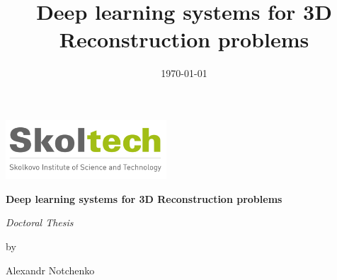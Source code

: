 \documentclass[a4paper, 11pt, oneside]{Thesis}  %
\begin{document}
\begin{titlepage}
 \begin{center}
 \phantom{a}\vspace{3.2cm}
 
\includegraphics[width=6cm]{sk.png}
  
  \large%
  \vspace{3.2cm}
  
  {\LARGE\bf Deep learning systems for 3D Reconstruction problems}
  \vspace{3cm}
  
  { \sl Doctoral Thesis\medskip
  
  by}\medskip
  
  Alexandr Notchenko
  \vspace{2cm}

  
  
  
 \end{center}

\end{titlepage}


\frontmatter      %

\title  {Deep learning systems for 3D Reconstruction problems}
\addresses  {\groupname\\\deptname\\\univname}  %
\date       {\today}
\subject    {}
\keywords   {}

\maketitle


\fancyhead{}  %
\rhead{\thepage}  %
\lhead{}  %
\end{document}
